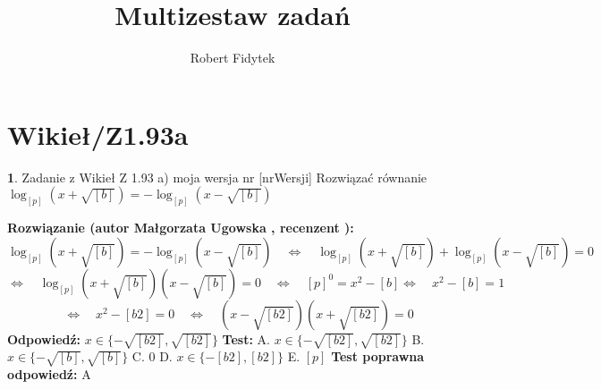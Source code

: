\documentclass[12pt, a4paper]{article}
\title{Multizestaw zadań}
\author{Robert Fidytek}
\date{}
\theoremstyle{definition} %
\newtheorem{zad}{}
\newcommand{\kategoria}[1]{\section{#1}} %
\newcommand{\zadStart}[1]{\begin{zad}#1\newline} %
\newcommand{\zadStop}{\end{zad}}   %
\newcommand{\rozwStart}[2]{\noindent \textbf{Rozwiązanie (autor #1 , recenzent #2): }\newline} %
\newcommand{\rozwStop}{\newline}                                            %
\newcommand{\odpStart}{\noindent \textbf{Odpowiedź:}\newline}    %
\newcommand{\odpStop}{\newline}                                             %
\newcommand{\testStart}{\noindent \textbf{Test:}\newline} %
\newcommand{\testStop}{\newline} %
\newcommand{\kluczStart}{\noindent \textbf{Test poprawna odpowiedź:}\newline} %
\newcommand{\kluczStop}{\newline} %
\begin{document}
\maketitle


\kategoria{Wikieł/Z1.93a}
\zadStart{Zadanie z Wikieł Z 1.93 a) moja wersja nr [nrWersji]}
Rozwiązać równanie $\log_{[p]}{(x+\sqrt{[b]})}=-\log_{[p]}{(x-\sqrt{[b]})} $
\zadStop
\rozwStart{Małgorzata Ugowska}{}
$$\log_{[p]}{(x+\sqrt{[b]})}=-\log_{[p]}{(x-\sqrt{[b]})} \quad \Longleftrightarrow \quad \log_{[p]}{(x+\sqrt{[b]})}+\log_{[p]}{(x-\sqrt{[b]})}=0 $$
$$\Longleftrightarrow \quad \log_{[p]}{(x+\sqrt{[b]})(x-\sqrt{[b]})}=0 \quad \Longleftrightarrow \quad [p]^0=x^2-[b] \Longleftrightarrow \quad x^2-[b] = 1 $$
$$\quad \Longleftrightarrow \quad x^2-[b2]=0 \quad \Longleftrightarrow \quad (x-\sqrt{[b2]})(x+\sqrt{[b2]})=0$$
\rozwStop
\odpStart
$x \in \{-\sqrt{[b2]}, \sqrt{[b2]}\}$
\odpStop
\testStart
A. $x \in \{-\sqrt{[b2]}, \sqrt{[b2]}\}$
B. $x \in \{-\sqrt{[b]}, \sqrt{[b]}\}$
C. 0
D. $x \in \{-[b2], [b2]\}$
E. $[p]$
\testStop
\kluczStart
A
\kluczStop
\end{document}
